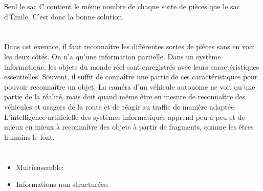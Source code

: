{{{\par}

Seul le sac C contient le même nombre de chaque sorte de pièces que le sac d’Émile. C’est donc la bonne solution.



\section*{\BrochureItsInformatics}
Dans cet exercice, il faut reconnaître les différentes sortes de pièces sans en voir les deux côtés. On n’a qu’une information partielle. Dans un système informatique, les objets du monde réel sont enregistrés avec leurs caractéristiques essentielles. Souvent, il suffit de connaître une partie de ces caractéristiques pour pouvoir reconnaître un objet. La caméra d’un véhicule autonome ne voit qu’une partie de la réalité, mais doit quand même être en mesure de reconnaître des véhicules et usagers de la route et de réagir au traffic de manière adaptée. L’intelligence artificielle des systèmes informatiques apprend peu à peu et de mieux en mieux à reconnaître des objets à partir de fragments, comme les êtres humains le font.



\section*{\BrochureWebsitesAndKeywords}
{\raggedright
\begin{itemize}
  \item Multiensemble: \href{https://fr.wikipedia.org/wiki/Multiensemble}{}
  \item Informations non structurées: \href{https://fr.wikipedia.org/wiki/Informations_non_structur\%C3\%A9es}{}
\end{itemize}


}

}{}

\def\AuthorNaughtonT{} %
\def\AuthorLehtimakiT{} %
\def\AuthorFutschekG{} %
\def\AuthorDatzkoS{} %
\def\AuthorLeonardM{} %
\def\AuthorPelletE{} %

\newpage}{}
